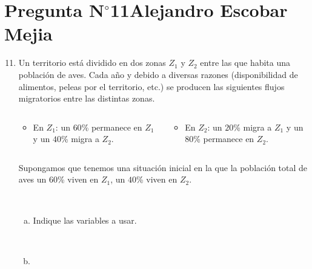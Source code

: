 \section{Pregunta N$^{\circ}$11\qquad Alejandro Escobar Mejia}

\begin{frame}
	\begin{enumerate}\setcounter{enumi}{10}
		\item

		      Un territorio está dividido en dos zonas $Z_{1}$ y
		      $Z_{2}$ entre las que habita una población de aves.
		      Cada año y debido a diversas razones (disponibilidad de
		      alimentos, peleas por el territorio, etc.) se producen
		      las siguientes flujos migratorios entre las distintas
		      zonas.

		      \begin{columns}
			      \begin{column}{0.48\textwidth}
				      \begin{itemize}
					      \item

					            En $Z_{1}$: un $60$\% permanece en $Z_{1}$
					            y un $40$\% migra a $Z_{2}$.
				      \end{itemize}
			      \end{column}
			      \begin{column}{0.48\textwidth}
				      \begin{itemize}
					      \item

					            En $Z_{2}$: un $20$\% migra a $Z_{1}$ y un
					            $80$\% permanece en $Z_{2}$.
				      \end{itemize}
			      \end{column}
		      \end{columns}

		      Supongamos que tenemos una situación inicial en la que la
		      población total de aves un $60$\% viven en $Z_{1}$, un
		      $40$\% viven en $Z_{2}$.

		      \

		      \begin{enumerate}[a)]
			      \item

			            Indique las variables a usar.

			            \

			      \item


\end{enumerate}
\end{enumerate}
\end{frame}
